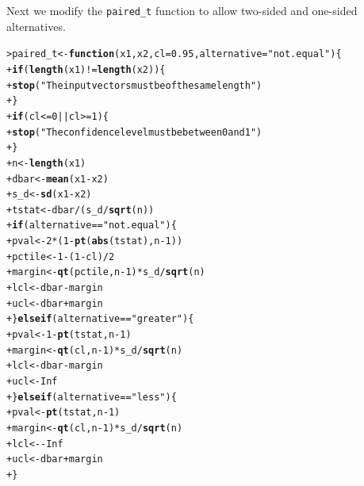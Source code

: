 \documentclass[12pt,oneside]{book}\usepackage[]{graphicx}\usepackage[]{color}
\makeatletter
\newcommand{\hlnum}[1]{\textcolor[rgb]{0.686,0.059,0.569}{#1}}%
\newcommand{\hlstr}[1]{\textcolor[rgb]{0.192,0.494,0.8}{#1}}%
\newcommand{\hlopt}[1]{\textcolor[rgb]{0,0,0}{#1}}%
\newcommand{\hlstd}[1]{\textcolor[rgb]{0.345,0.345,0.345}{#1}}%
\newcommand{\hlkwa}[1]{\textcolor[rgb]{0.161,0.373,0.58}{\textbf{#1}}}%
\newcommand{\hlkwb}[1]{\textcolor[rgb]{0.69,0.353,0.396}{#1}}%
\newcommand{\hlkwc}[1]{\textcolor[rgb]{0.333,0.667,0.333}{#1}}%
\newcommand{\hlkwd}[1]{\textcolor[rgb]{0.737,0.353,0.396}{\textbf{#1}}}%
\newenvironment{kframe}{%
 \def\at@end@of@kframe{}%
 \ifinner\ifhmode%
  \def\at@end@of@kframe{\end{minipage}}%
  \begin{minipage}{\columnwidth}%
 \fi\fi%
 \def\FrameCommand##1{\hskip\@totalleftmargin \hskip-\fboxsep
 \colorbox{shadecolor}{##1}\hskip-\fboxsep
     \hskip-\linewidth \hskip-\@totalleftmargin \hskip\columnwidth}%
 \MakeFramed {\advance\hsize-\width
   \@totalleftmargin\z@ \linewidth\hsize
   \@setminipage}}%
 {\par\unskip\endMakeFramed%
 \at@end@of@kframe}
\newenvironment{knitrout}{}{} %
\makeatother
\begin{document}
Next we modify the \verb+paired_t+ function to allow two-sided and one-sided alternatives.
\begin{knitrout}
\color{fgcolor}\begin{kframe}
\begin{alltt}
\hlstd{> }\hlstd{paired_t} \hlkwb{<-} \hlkwa{function}\hlstd{(}\hlkwc{x1}\hlstd{,} \hlkwc{x2}\hlstd{,} \hlkwc{cl} \hlstd{=} \hlnum{0.95}\hlstd{,} \hlkwc{alternative} \hlstd{=} \hlstr{"not.equal"}\hlstd{) \{}
\hlstd{+ }    \hlkwa{if} \hlstd{(}\hlkwd{length}\hlstd{(x1)} \hlopt{!=} \hlkwd{length}\hlstd{(x2)) \{}
\hlstd{+ }        \hlkwd{stop}\hlstd{(}\hlstr{"The input vectors must be of the same length"}\hlstd{)}
\hlstd{+ }    \hlstd{\}}
\hlstd{+ }    \hlkwa{if} \hlstd{(cl} \hlopt{<=} \hlnum{0} \hlopt{||} \hlstd{cl} \hlopt{>=} \hlnum{1}\hlstd{) \{}
\hlstd{+ }        \hlkwd{stop}\hlstd{(}\hlstr{"The confidence level must be between 0 and 1"}\hlstd{)}
\hlstd{+ }    \hlstd{\}}
\hlstd{+ }    \hlstd{n} \hlkwb{<-} \hlkwd{length}\hlstd{(x1)}
\hlstd{+ }    \hlstd{dbar} \hlkwb{<-} \hlkwd{mean}\hlstd{(x1} \hlopt{-} \hlstd{x2)}
\hlstd{+ }    \hlstd{s_d} \hlkwb{<-} \hlkwd{sd}\hlstd{(x1} \hlopt{-} \hlstd{x2)}
\hlstd{+ }    \hlstd{tstat} \hlkwb{<-} \hlstd{dbar}\hlopt{/}\hlstd{(s_d}\hlopt{/}\hlkwd{sqrt}\hlstd{(n))}
\hlstd{+ }    \hlkwa{if} \hlstd{(alternative} \hlopt{==} \hlstr{"not.equal"}\hlstd{) \{}
\hlstd{+ }        \hlstd{pval} \hlkwb{<-} \hlnum{2} \hlopt{*} \hlstd{(}\hlnum{1} \hlopt{-} \hlkwd{pt}\hlstd{(}\hlkwd{abs}\hlstd{(tstat), n} \hlopt{-} \hlnum{1}\hlstd{))}
\hlstd{+ }        \hlstd{pctile} \hlkwb{<-} \hlnum{1} \hlopt{-} \hlstd{(}\hlnum{1} \hlopt{-} \hlstd{cl)}\hlopt{/}\hlnum{2}
\hlstd{+ }        \hlstd{margin} \hlkwb{<-} \hlkwd{qt}\hlstd{(pctile, n} \hlopt{-} \hlnum{1}\hlstd{)} \hlopt{*} \hlstd{s_d}\hlopt{/}\hlkwd{sqrt}\hlstd{(n)}
\hlstd{+ }        \hlstd{lcl} \hlkwb{<-} \hlstd{dbar} \hlopt{-} \hlstd{margin}
\hlstd{+ }        \hlstd{ucl} \hlkwb{<-} \hlstd{dbar} \hlopt{+} \hlstd{margin}
\hlstd{+ }    \hlstd{\}} \hlkwa{else if} \hlstd{(alternative} \hlopt{==} \hlstr{"greater"}\hlstd{) \{}
\hlstd{+ }        \hlstd{pval} \hlkwb{<-} \hlnum{1} \hlopt{-} \hlkwd{pt}\hlstd{(tstat, n} \hlopt{-} \hlnum{1}\hlstd{)}
\hlstd{+ }        \hlstd{margin} \hlkwb{<-} \hlkwd{qt}\hlstd{(cl, n} \hlopt{-} \hlnum{1}\hlstd{)} \hlopt{*} \hlstd{s_d}\hlopt{/}\hlkwd{sqrt}\hlstd{(n)}
\hlstd{+ }        \hlstd{lcl} \hlkwb{<-} \hlstd{dbar} \hlopt{-} \hlstd{margin}
\hlstd{+ }        \hlstd{ucl} \hlkwb{<-} \hlnum{Inf}
\hlstd{+ }    \hlstd{\}} \hlkwa{else if} \hlstd{(alternative} \hlopt{==} \hlstr{"less"}\hlstd{) \{}
\hlstd{+ }        \hlstd{pval} \hlkwb{<-} \hlkwd{pt}\hlstd{(tstat, n} \hlopt{-} \hlnum{1}\hlstd{)}
\hlstd{+ }        \hlstd{margin} \hlkwb{<-} \hlkwd{qt}\hlstd{(cl, n} \hlopt{-} \hlnum{1}\hlstd{)} \hlopt{*} \hlstd{s_d}\hlopt{/}\hlkwd{sqrt}\hlstd{(n)}
\hlstd{+ }        \hlstd{lcl} \hlkwb{<-} \hlopt{-}\hlnum{Inf}
\hlstd{+ }        \hlstd{ucl} \hlkwb{<-} \hlstd{dbar} \hlopt{+} \hlstd{margin}
\hlstd{+ }    \hlstd{\}}


\end{alltt}
\end{kframe}
\end{knitrout}
\end{document}

